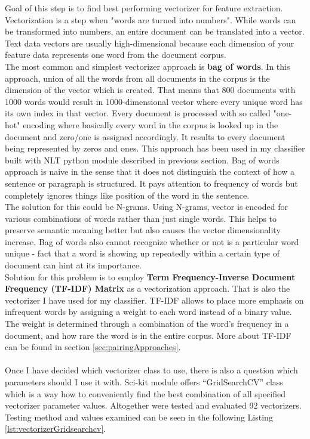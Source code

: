 Goal of this step is to find best performing vectorizer for feature extraction.	Vectorization is a step when "words are turned into numbers". While words can be transformed into numbers, an entire document can be translated into a vector. Text data vectors are usually high-dimensional because each dimension of your feature data represents one word from the document corpus.\\
The most common and simplest vectorizer approach is \textbf{bag of words}.	In this approach, union of all the words from all documents in the corpus is the dimension of the vector which is created. That means that 800 documents with 1000 words would result in 1000-dimensional vector where every unique word has its own index in that vector. Every document is processed with so called "one-hot" encoding where basically every word in the corpus is looked up in the document and zero/one is assigned accordingly. It results to every document being represented by zeros and ones. This approach has been used in my classifier built with NLT python module described in previous section. Bag of words approach is naive in the sense that it does not distinguish the context of how a sentence or paragraph is structured. It pays attention to frequency of words but completely ignores things like position of the word in the sentence. \\
The solution for this could be N-grams. Using N-grams, vector is encoded for various combinations of words rather than just single words. This helps to preserve semantic meaning better but also causes the vector dimensionality increase. Bag of words also cannot recognize whether or not is a particular word unique - fact that a word is showing up repeatedly within a certain type of document can hint at its importance. \\
Solution for this problem is to employ \textbf{Term Frequency-Inverse Document Frequency (TF-IDF) Matrix} as a vectorization approach. That is also the vectorizer I have used for my classifier. TF-IDF allows to place more emphasis on infrequent words by assigning a weight to each word instead of a binary value. The weight is determined through a combination of the word's frequency in a document, and how rare the word is in the entire corpus. More about TF-IDF can be found in section \ref{sec:pairingApproaches}. \\
\\
Once I have decided which vectorizer class to use, there is also a question which parameters should I use it with. Sci-kit module offers “GridSearchCV” class which is a way how to conveniently find the best combination of all specified vectorizer parameter values. Altogether were tested and evaluated 92 vectorizers. Testing method and values examined can be seen in the following Listing \ref{lst:vectorizerGridsearchcv}. 
